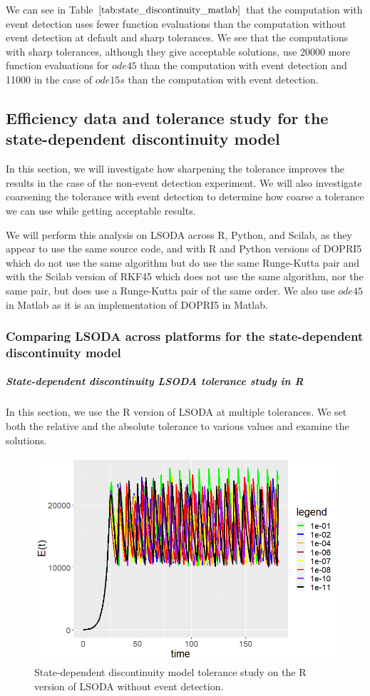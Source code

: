We can see in Table $\ref{tab:state_discontinuity_matlab}$ that the computation with event detection uses fewer function evaluations than the computation without event detection at default and sharp tolerances. We see that the computations with sharp tolerances, although they give acceptable solutions, use 20000 more function evaluations for $ode45$ than the computation with event detection and 11000 in the case of $ode15s$ than the computation with event detection.

\subsection{Efficiency data and tolerance study for the state-dependent discontinuity model}
\label{subsection:state_tolerance_study}
In this section, we will investigate how sharpening the tolerance improves the results in the case of the non-event detection experiment. We will also investigate coarsening the tolerance with event detection to determine how coarse a tolerance we can use while getting acceptable results.

We will perform this analysis on LSODA across R, Python, and Scilab, as they appear to use the same source code, and with R and Python versions of DOPRI5 which do not use the same algorithm but do use the same Runge-Kutta pair and with the Scilab version of RKF45 which does not use the same algorithm, nor the same pair, but does use a Runge-Kutta pair of the same order. We also use $ode45$ in Matlab as it is an implementation of DOPRI5 in Matlab. 

\subsubsection{Comparing LSODA across platforms for the state-dependent discontinuity model}
\subparagraph{State-dependent discontinuity LSODA tolerance study in R}
In this section, we use the R version of LSODA at multiple tolerances. We set both the relative and the absolute tolerance to various values and examine the solutions.

\begin{figure}[h]
\centering
\includegraphics[width=0.7\linewidth]{./figures/tolerance_state_lsoda_no_event_R}
\caption{State-dependent discontinuity model tolerance study on the R version of LSODA without event detection.}
\label{fig:tolerance_state_lsoda_no_event_R}
\end{figure}

